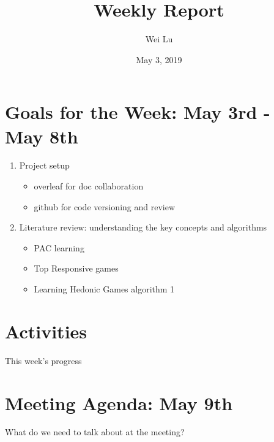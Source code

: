 \documentclass[a4paper]{article}
\title{Weekly Report}
\date{May 3, 2019}
\author{Wei Lu}
\begin{document}
\maketitle

\section{Goals for the Week: May 3rd - May 8th}

\begin{enumerate}
  \item Project setup
  \begin{itemize}
    \item overleaf for doc collaboration
    \item github for code versioning and review
  \end{itemize}

  \item Literature review: understanding the key concepts and algorithms
  \begin{itemize}
    \item PAC learning
    \item Top Responsive games
    \item Learning Hedonic Games \cite{ijcai2017-380} algorithm 1
  \end{itemize}

\end{enumerate}


\section{Activities}

This week's progress

\section{Meeting Agenda: May 9th}

What do we need to talk about at the meeting?

\end{document}
